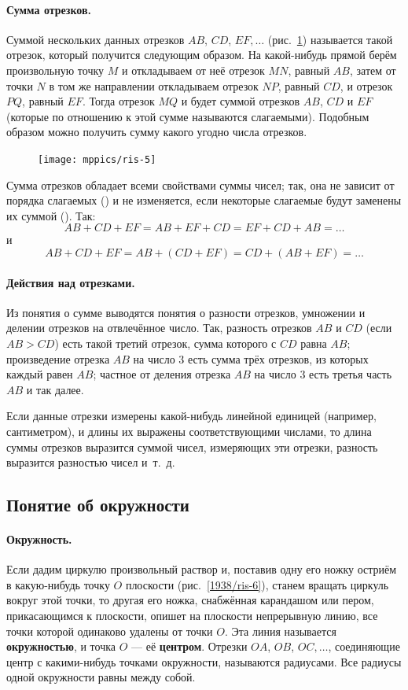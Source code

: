 \documentclass[oneside]{book}
\makeatletter
\newcommand{\rindex}[2][\imki@jobname]{%
  \index[#1]{\detokenize{#2}}%
}
\makeatother
\begin{document}
\paragraph{Сумма отрезков.}\label{1938/7}
Суммой нескольких данных отрезков $AB$, $CD$, $EF,\dots$
(рис.~\ref{1938/ris-5}) называется такой отрезок, который получится следующим образом.
На какой-нибудь прямой берём произвольную точку $M$ и откладываем от неё отрезок $MN$, равный $AB$, затем от точки $N$ в том же направлении откладываем отрезок $NP$, равный $CD$, и отрезок $PQ$, равный $EF$.
Тогда отрезок $MQ$ и будет суммой отрезков $AB$, $CD$ и $EF$ (которые по отношению к этой сумме называются слагаемыми).
Подобным образом можно получить сумму какого угодно числа отрезков.

\begin{figure}[h!]
\centering
\texttt{[image: mppics/ris-5]}
\caption{}\label{1938/ris-5}
\end{figure}

Сумма отрезков обладает всеми свойствами суммы чисел;
так, она не зависит от порядка слагаемых () и не изменяется, если некоторые слагаемые будут заменены их суммой ().
Так:
\[AB+CD+EF=AB+EF+CD=EF+CD+AB=\dots\]
и
\[AB+CD+EF=AB+(CD+EF)=CD+(AB+EF)=\dots\]

\paragraph{Действия над отрезками.}\label{1938/8}
Из понятия о сумме выводятся понятия о разности отрезков, умножении и делении отрезков на отвлечённое число.
Так, разность отрезков $AB$ и $CD$ (если $AB>CD$) есть такой третий отрезок, сумма которого с $CD$ равна $AB$;
произведение отрезка $AB$ на число $3$ есть сумма трёх отрезков, из которых каждый равен $AB$;
частное от деления отрезка $AB$ на число $3$ есть третья часть $AB$ и так далее.

Если данные отрезки измерены какой-нибудь линейной единицей (например, сантиметром), и длины их выражены соответствующими числами, то длина суммы отрезков выразится суммой чисел, измеряющих эти отрезки, разность выразится разностью чисел и~т.~д.

\subsection*{Понятие об окружности}

\paragraph{Окружность.}\label{1938/9}
Если дадим циркулю произвольный раствор и, поставив одну его ножку остриём в какую-нибудь точку $O$ плоскости (рис.~\ref{1938/ris-6}), станем вращать циркуль вокруг этой точки, то другая его ножка, снабжённая карандашом или пером, прикасающимся к плоскости, опишет на плоскости непрерывную линию, все точки которой одинаково удалены от точки $O$.
Эта линия называется \rindex{окружность}\textbf{окружностью}, и точка $O$ — её \rindex{центр окружности}\textbf{центром}.
Отрезки $OA$, $OB$, $OC,\dots$, соединяющие центр с какими-нибудь точками окружности, называются радиусами.
Все радиусы одной окружности равны между собой.
\end{document}
